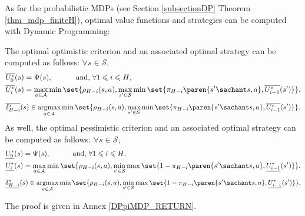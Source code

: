 As for the probabilistic MDPs (see Section \ref{subsectionDP} Theorem \ref{thm_mdp_finiteH}),
optimal value functions and strategies can be computed with Dynamic Programming:
\begin{theorem}
\label{DPpiMDP}
The optimal optimistic criterion and an associated optimal strategy 
can be computed as follows: $\forall s \in \mathcal{S}$,
\begin{align}
\nonumber 
\overline{U_0^*}(s) & = \Psi(s), \mbox{\hspace{1cm} and, $\forall 1 \leqslant i \leqslant H$,} \\
\label{equation_recursiveopt} 
\overline{U_{i}^*}(s)& = \max_{a \in \mathcal{A}} \min \set{ \rho_{H-i}(s,a), \max_{s' \in \mathcal{S}} \min \set{ \pi_{H-i} \paren{ s' \sachant s, a  } , \overline{U^*_{i-1}}(s') }  }.
\end{align}
\begin{eqnarray}
\label{equation_recursiveoptstrat} 
\overline{\delta^*_{H-i}}(s) \in \operatorname*{argmax}_{a \in \mathcal{A}} \min \set{ \rho_{H-i}(s,a), \max_{s' \in \mathcal{S}} \min \set{ \pi_{H-i} \paren{ s' \sachant s, a  } , \overline{U^*_{i-1}}(s') }  }.
\end{eqnarray}
As well, the optimal pessimistic criterion and an associated optimal strategy 
can be computed as follows: $\forall s \in \mathcal{S}$,
\begin{align}
\nonumber 
\underline{U_0^*}(s) & = \Psi(s), \mbox{\hspace{1cm} and, $\forall 1 \leqslant i \leqslant H$,} \\
\label{equation_recursivepess} 
\underline{U_{i}^*}(s)& = \max_{a \in \mathcal{A}} \min \set{ \rho_{H-i}(s,a), \min_{s' \in \mathcal{S}} \max \set{ 1 - \pi_{H-i} \paren{ s' \sachant s, a  } , \underline{U^*_{i-1}}(s') }  }.
\end{align}
\begin{eqnarray}
\label{equation_recursivepessstrat} 
\underline{\delta^*_{H-i}}(s) \in \operatorname*{argmax}_{a \in \mathcal{A}} \min \set{ \rho_{H-i}(s,a), \min_{s' \in \mathcal{S}} \max \set{ 1 - \pi_{H-i} \paren{ s' \sachant s, a  } , \underline{U^*_{i-1}}(s') }  }.
\end{eqnarray}
\end{theorem}
The proof is given in Annex \ref{DPpiMDP_RETURN}.


